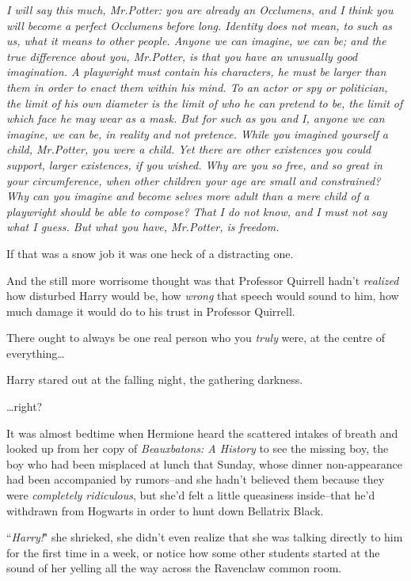 \emph{I will say this much, Mr.\?Potter: you are already an Occlumens, and I think you will become a perfect Occlumens before long. Identity does not mean, to such as us, what it means to other people. Anyone we can imagine, we can be; and the true difference about you, Mr.\?Potter, is that you have an unusually good imagination. A playwright must contain his characters, he must be larger than them in order to enact them within his mind. To an actor or spy or politician, the limit of his own diameter is the limit of who he can pretend to be, the limit of which face he may wear as a mask. But for such as you and I, anyone we can imagine, we can \emph{be}, in reality and not pretence. While you imagined yourself a child, Mr.\?Potter, you \emph{were} a child. Yet there are other existences you could support, larger existences, if you wished. Why are you so free, and so great in your circumference, when other children your age are small and constrained? Why can you imagine and \emph{become} selves more adult than a mere child of a playwright should be able to compose? That I do not know, and I must not say what I guess. But what you have, Mr.\?Potter, is freedom.}

If that was a snow job it was one heck of a distracting one.

And the still more worrisome thought was that Professor Quirrell hadn't \emph{realized} how disturbed Harry would be, how \emph{wrong} that speech would sound to him, how much damage it would do to his trust in Professor Quirrell.

There ought to always be one real person who you \emph{truly} were, at the centre of everything{\ldots}

Harry stared out at the falling night, the gathering darkness.

{\ldots}right?

\later

It was almost bedtime when Hermione heard the scattered intakes of breath and looked up from her copy of \emph{Beauxbatons: A History} to see the missing boy, the boy who had been misplaced at lunch that Sunday, whose dinner non-appearance had been accompanied by rumors\---and she hadn't believed them because they were \emph{completely ridiculous}, but she'd felt a little queasiness inside\---that he'd withdrawn from Hogwarts in order to hunt down Bellatrix Black.

``\emph{Harry!}" she shrieked, she didn't even realize that she was talking directly to him for the first time in a week, or notice how some other students started at the sound of her yelling all the way across the Ravenclaw common room.

